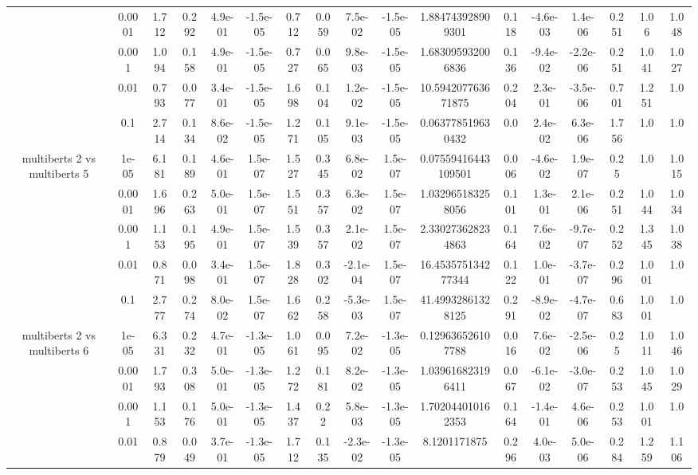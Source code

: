 \begin{tabular}{|c|c|c|c|c|c|c|c|c|c|c|c|c|c|c|c|c|}
 & 0.0001 & 1.712 & 0.292 & 4.9e-01 & -1.5e-05 & 0.712 & 0.059 & 7.5e-02 & -1.5e-05 & 1.884743928909301 & 0.118 & -4.6e-03 & 1.4e-06 & 0.251 & 1.06 & 1.048 \\
 & 0.001 & 1.094 & 0.158 & 4.9e-01 & -1.5e-05 & 0.727 & 0.065 & 9.8e-03 & -1.5e-05 & 1.683095932006836 & 0.136 & -9.4e-02 & -2.2e-06 & 0.251 & 1.041 & 1.027 \\
 & 0.01 & 0.793 & 0.077 & 3.4e-01 & -1.5e-05 & 1.698 & 0.104 & 1.2e-02 & -1.5e-05 & 10.594207763671875 & 0.204 & 2.3e-01 & -3.5e-06 & 0.701 & 1.251 & 1.0 \\
 & 0.1 & 2.714 & 0.134 & 8.6e-02 & -1.5e-05 & 1.271 & 0.105 & 9.1e-03 & -1.5e-05 & 0.063778519630432 & 0.0 & 2.4e-02 & 6.3e-06 & 1.756 & 1.0 & 1.0 \\
\hline
\multirow{5}{*}{multiberts 2 vs multiberts 5} & 1e-05 & 6.181 & 0.189 & 4.6e-01 & 1.5e-07 & 1.527 & 0.345 & 6.8e-02 & 1.5e-07 & 0.07559416443109501 & 0.006 & -4.6e-02 & 1.9e-07 & 0.25 & 1.0 & 1.015 \\
 & 0.0001 & 1.696 & 0.263 & 5.0e-01 & 1.5e-07 & 1.551 & 0.357 & 6.3e-02 & 1.5e-07 & 1.032965183258056 & 0.101 & 1.3e-01 & 2.1e-06 & 0.251 & 1.044 & 1.034 \\
 & 0.001 & 1.153 & 0.195 & 4.9e-01 & 1.5e-07 & 1.539 & 0.357 & 2.1e-02 & 1.5e-07 & 2.330273628234863 & 0.164 & 7.6e-02 & -9.7e-07 & 0.252 & 1.345 & 1.038 \\
 & 0.01 & 0.871 & 0.098 & 3.4e-01 & 1.5e-07 & 1.828 & 0.302 & -2.1e-04 & 1.5e-07 & 16.453575134277344 & 0.122 & 1.0e-01 & -3.7e-07 & 0.296 & 1.001 & 1.0 \\
 & 0.1 & 2.777 & 0.274 & 8.0e-02 & 1.5e-07 & 1.662 & 0.258 & -5.3e-03 & 1.5e-07 & 41.49932861328125 & 0.291 & -8.9e-02 & -4.7e-07 & 0.683 & 1.001 & 1.0 \\
\hline
\multirow{5}{*}{multiberts 2 vs multiberts 6} & 1e-05 & 6.331 & 0.232 & 4.7e-01 & -1.3e-05 & 1.061 & 0.095 & 7.2e-02 & -1.3e-05 & 0.129636526107788 & 0.016 & 7.6e-02 & -2.5e-06 & 0.25 & 1.011 & 1.046 \\
 & 0.0001 & 1.793 & 0.308 & 5.0e-01 & -1.3e-05 & 1.272 & 0.181 & 8.2e-02 & -1.3e-05 & 1.039616823196411 & 0.067 & -6.1e-02 & -3.0e-07 & 0.253 & 1.045 & 1.029 \\
 & 0.001 & 1.153 & 0.176 & 5.0e-01 & -1.3e-05 & 1.437 & 0.22 & 5.8e-03 & -1.3e-05 & 1.702044010162353 & 0.164 & -1.4e-01 & 4.6e-06 & 0.253 & 1.001 & 1.0 \\
 & 0.01 & 0.879 & 0.049 & 3.7e-01 & -1.3e-05 & 1.712 & 0.135 & -2.3e-02 & -1.3e-05 & 8.1201171875 & 0.296 & 4.0e-03 & 5.0e-06 & 0.284 & 1.259 & 1.106 \\

\end{tabular}
